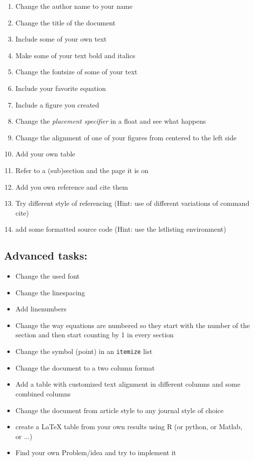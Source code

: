 \documentclass{article}
\begin{document}
\begin{enumerate}
	\item Change the author name to your name
	\item Change the title of the document
    \item Include some of your own text
    \item Make some of your text bold and italics
    \item Change the fontsize of some of your text
    \item Include your favorite equation
    \item Include a figure you created
    \item Change the \textit{placement specifier} in a float and see what happens
    \item Change the alignment of one of your figures from centered to the left side
    \item Add your own table
    \item Refer to a (sub)section and the page it is on
    \item Add you own reference and cite them
    \item Try different style of referencing (Hint: use of different variations of command cite)
    \item add some formatted source code (Hint: use the lstlisting environment)
\end{enumerate}

\subsection{Advanced tasks:}

\begin{itemize}
    \item Change the used font
    \item Change the linespacing
    \item Add linenumbers
    \item Change the way equations are numbered so they start with the number of the section and then start counting by 1 in every section
    \item Change the symbol (point) in an \texttt{itemize} list
    \item Change the document to a two column format
    \item Add a table with customized text alignment in different columns and some combined columns
    \item Change the document from article style to any journal style of choice
    \item create a \LaTeX{} table from your own results using R (or python, or Matlab, or ...)
    \item Find your own Problem/idea and try to implement it
\end{itemize}



\end{document}

